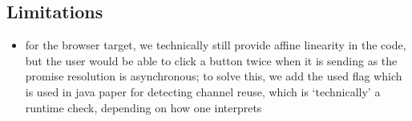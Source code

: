 \subsection{Limitations}
\begin{itemize}
\item for the browser target, we technically still provide affine linearity in the code, but the user would be able to click a button twice when it is sending as the promise resolution is asynchronous; to solve this, we add the used flag which is used in java paper for detecting channel reuse, which is `technically' a runtime check, depending on how one interprets
\end{itemize}